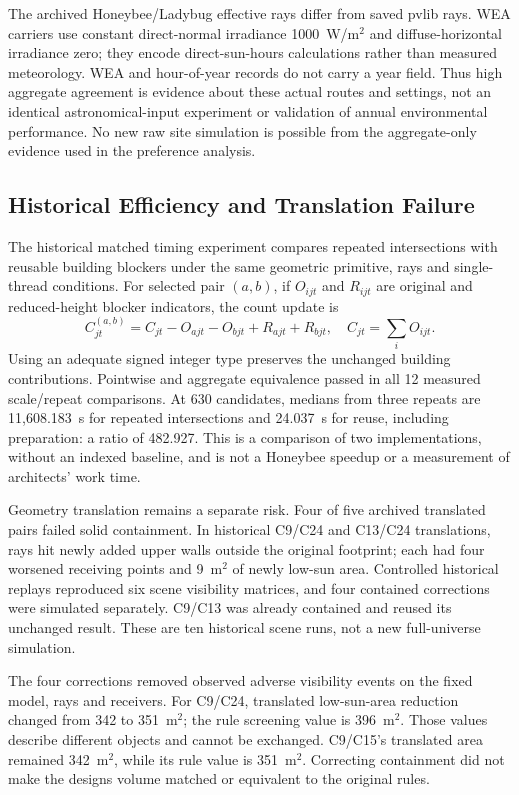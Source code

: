 \documentclass{llncs}
\begin{document}
The archived Honeybee/Ladybug effective rays differ from saved pvlib rays. WEA carriers use constant direct-normal irradiance 1000~W/m$^2$ and diffuse-horizontal irradiance zero; they encode direct-sun-hours calculations rather than measured meteorology. WEA and hour-of-year records do not carry a year field. Thus high aggregate agreement is evidence about these actual routes and settings, not an identical astronomical-input experiment or validation of annual environmental performance. No new raw site simulation is possible from the aggregate-only evidence used in the preference analysis.

\subsection{Historical Efficiency and Translation Failure}
The historical matched timing experiment compares repeated intersections with reusable building blockers under the same geometric primitive, rays and single-thread conditions. For selected pair $(a,b)$, if $O_{ijt}$ and $R_{ijt}$ are original and reduced-height blocker indicators, the count update is
\begin{equation}
 C_{jt}^{(a,b)}=C_{jt}-O_{ajt}-O_{bjt}+R_{ajt}+R_{bjt},\quad C_{jt}=\sum_i O_{ijt}.
\label{eq:blocker}
\end{equation}
Using an adequate signed integer type preserves the unchanged building contributions. Pointwise and aggregate equivalence passed in all 12 measured scale/repeat comparisons. At 630 candidates, medians from three repeats are 11,608.183~s for repeated intersections and 24.037~s for reuse, including preparation: a ratio of 482.927. This is a comparison of two implementations, without an indexed baseline, and is not a Honeybee speedup or a measurement of architects' work time.

Geometry translation remains a separate risk. Four of five archived translated pairs failed solid containment. In historical C9/C24 and C13/C24 translations, rays hit newly added upper walls outside the original footprint; each had four worsened receiving points and 9~m$^2$ of newly low-sun area. Controlled historical replays reproduced six scene visibility matrices, and four contained corrections were simulated separately. C9/C13 was already contained and reused its unchanged result. These are ten historical scene runs, not a new full-universe simulation.

The four corrections removed observed adverse visibility events on the fixed model, rays and receivers. For C9/C24, translated low-sun-area reduction changed from 342 to 351~m$^2$; the rule screening value is 396~m$^2$. Those values describe different objects and cannot be exchanged. C9/C15's translated area remained 342~m$^2$, while its rule value is 351~m$^2$. Correcting containment did not make the designs volume matched or equivalent to the original rules.
\end{document}
